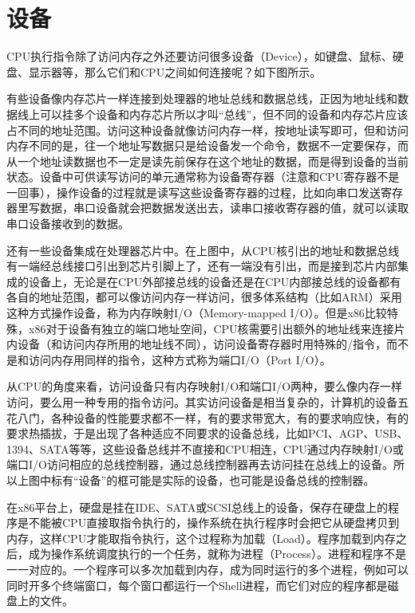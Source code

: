 \section{设备}
%
CPU执行指令除了访问内存之外还要访问很多设备（Device），如键盘、鼠标、硬盘、显示器等，那么它们和CPU之间如何连接呢？如下图所示。




有些设备像内存芯片一样连接到处理器的地址总线和数据总线，正因为地址线和数据线上可以挂多个设备和内存芯片所以才叫“总线”，但不同的设备和内存芯片应该占不同的地址范围。访问这种设备就像访问内存一样，按地址读写即可，但和访问内存不同的是，往一个地址写数据只是给设备发一个命令，数据不一定要保存，而从一个地址读数据也不一定是读先前保存在这个地址的数据，而是得到设备的当前状态。设备中可供读写访问的单元通常称为设备寄存器（注意和CPU寄存器不是一回事），操作设备的过程就是读写这些设备寄存器的过程，比如向串口发送寄存器里写数据，串口设备就会把数据发送出去，读串口接收寄存器的值，就可以读取串口设备接收到的数据。



还有一些设备集成在处理器芯片中。在上图中，从CPU核引出的地址和数据总线有一端经总线接口引出到芯片引脚上了，还有一端没有引出，而是接到芯片内部集成的设备上，无论是在CPU外部接总线的设备还是在CPU内部接总线的设备都有各自的地址范围，都可以像访问内存一样访问，很多体系结构（比如ARM）采用这种方式操作设备，称为内存映射I/\BookSplit{}O（Memory-mapped I/\BookSplit{}O）。但是x86比较特殊，x86对于设备有独立的端口地址空间，CPU核需要引出额外的地址线来连接片内设备（和访问内存所用的地址线不同），访问设备寄存器时用特殊的/指令，而不是和访问内存用同样的指令，这种方式称为端口I/\BookSplit{}O（Port I/\BookSplit{}O）。



从CPU的角度来看，访问设备只有内存映射I/\BookSplit{}O和端口I/\BookSplit{}O两种，要么像内存一样访问，要么用一种专用的指令访问。其实访问设备是相当复杂的，计算机的设备五花八门，各种设备的性能要求都不一样，有的要求带宽大，有的要求响应快，有的要求热插拔，于是出现了各种适应不同要求的设备总线，比如PCI、AGP、USB、1394、SATA等等，这些设备总线并不直接和CPU相连，CPU通过内存映射I/\BookSplit{}O或端口I/\BookSplit{}O访问相应的总线控制器，通过总线控制器再去访问挂在总线上的设备。所以上图中标有“设备”的框可能是实际的设备，也可能是设备总线的控制器。



在x86平台上，硬盘是挂在IDE、SATA或SCSI总线上的设备，保存在硬盘上的程序是不能被CPU直接取指令执行的，操作系统在执行程序时会把它从硬盘拷贝到内存，这样CPU才能取指令执行，这个过程称为加载（Load）。程序加载到内存之后，成为操作系统调度执行的一个任务，就称为进程（Process）。进程和程序不是一一对应的。一个程序可以多次加载到内存，成为同时运行的多个进程，例如可以同时开多个终端窗口，每个窗口都运行一个Shell进程，而它们对应的程序都是磁盘上的文件。



